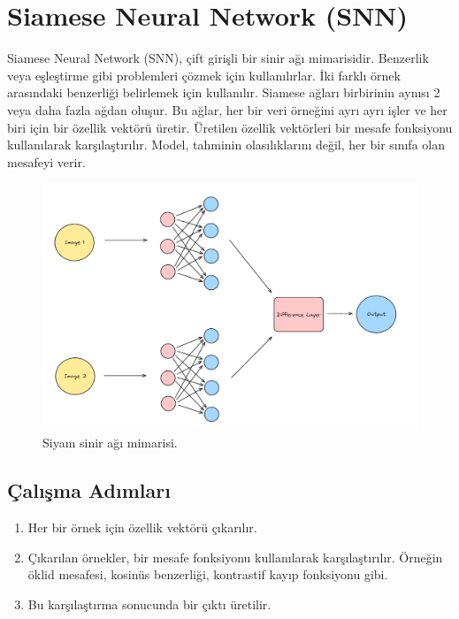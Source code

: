 \section{Siamese Neural Network (SNN)}
Siamese Neural Network (SNN), çift girişli bir sinir ağı mimarisidir. Benzerlik veya eşleştirme gibi problemleri çözmek için kullanılırlar. İki farklı örnek arasındaki benzerliği belirlemek için kullanılır. Siamese ağları birbirinin aynısı 2 veya daha fazla ağdan oluşur. Bu ağlar, her bir veri örneğini ayrı ayrı işler ve her biri için bir özellik vektörü üretir. Üretilen özellik vektörleri bir mesafe fonksiyonu kullanılarak karşılaştırılır. Model, tahminin olasılıklarını değil, her bir sınıfa olan mesafeyi verir. 

\begin{figure}[h]
    \centering
    \includegraphics[width=1\textwidth]{images/siamese_neural_network.png}
    \caption{Siyam sinir ağı mimarisi.}
    \label{fig:enter-label}
\end{figure}

\subsection{Çalışma Adımları}
\begin{enumerate}
    \item Her bir örnek için özellik vektörü çıkarılır.
    \item Çıkarılan örnekler, bir mesafe fonksiyonu kullanılarak karşılaştırılır. Örneğin öklid mesafesi, kosinüs benzerliği, kontrastif kayıp fonksiyonu gibi.
    \item Bu karşılaştırma sonucunda bir çıktı üretilir.
\end{enumerate}

